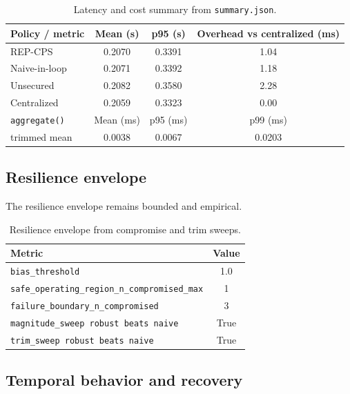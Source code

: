 \documentclass[11pt]{article}
\newcommand{\repcps}{REP-CPS}
\newcommand{\tool}[1]{\texttt{#1}}
\newcommand{\field}[1]{\texttt{#1}}
\begin{document}
\begin{table}[H]
\centering
\caption{Latency and cost summary from \field{summary.json}.}
\label{tab:latency}
\begin{tabular}{lccc}
\toprule
Policy / metric & Mean (s) & p95 (s) & Overhead vs centralized (ms) \\
\midrule
\repcps{} & 0.2070 & 0.3391 & 1.04 \\
Naive-in-loop & 0.2071 & 0.3392 & 1.18 \\
Unsecured & 0.2082 & 0.3580 & 2.28 \\
Centralized & 0.2059 & 0.3323 & 0.00 \\
\midrule
\tool{aggregate()} & Mean (ms) & p95 (ms) & p99 (ms) \\
\midrule
trimmed mean & 0.0038 & 0.0067 & 0.0203 \\
\bottomrule
\end{tabular}
\end{table}

\subsection{Resilience envelope}

The resilience envelope remains bounded and empirical.

\begin{table}[H]
\centering
\caption{Resilience envelope from compromise and trim sweeps.}
\label{tab:envelope}
\begin{tabular}{lc}
\toprule
Metric & Value \\
\midrule
\field{bias\_threshold} & 1.0 \\
\field{safe\_operating\_region\_n\_compromised\_max} & 1 \\
\field{failure\_boundary\_n\_compromised} & 3 \\
\field{magnitude\_sweep robust beats naive} & True \\
\field{trim\_sweep robust beats naive} & True \\
\bottomrule
\end{tabular}
\end{table}

\subsection{Temporal behavior and recovery}
\end{document}
